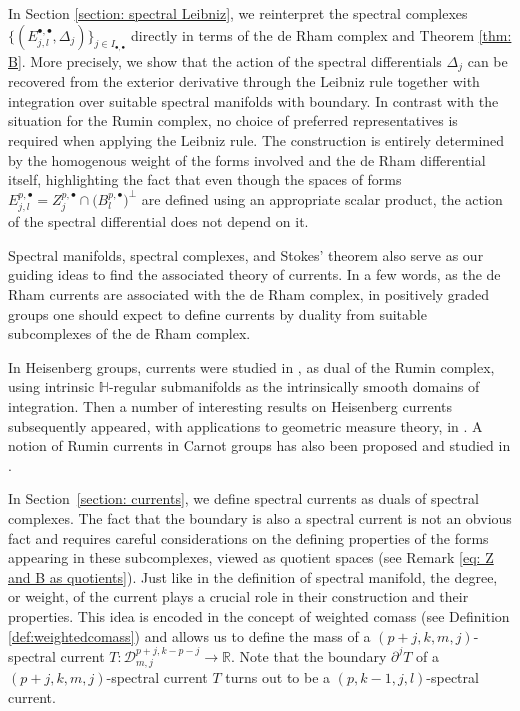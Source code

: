\documentclass[dvipsnames]{amsart}
\theoremstyle{definition}
\theoremstyle{definition}
\numberwithin{equation}{section}
\newcommand{\R}{\mathbb{R}}
\renewcommand{\H}{\mathbb{H}}
\begin{document}
In Section \ref{section: spectral Leibniz}, we reinterpret the spectral complexes $\{(E_{j,l}^{\bullet,\bullet},\Delta_j)\}_{j\in I_{\bullet,\bullet}}$ directly in terms of the de Rham complex and Theorem \ref{thm: B}. More precisely, we show that the action of the spectral differentials $\Delta_j$ can be recovered from the exterior derivative through the Leibniz rule together with integration over suitable spectral manifolds with boundary. In contrast with the situation for the Rumin complex, no choice of preferred representatives is required when applying the Leibniz rule. The construction is entirely determined by the homogenous weight of the forms involved and the de Rham differential itself, highlighting the fact that even though the spaces of forms $E_{j,l}^{p,\bullet}=Z_j^{p,\bullet}\cap\big(B_l^{p,\bullet}\big)^\perp$ are defined using an appropriate scalar product, the action of the spectral differential does not depend on it. 


Spectral manifolds, spectral complexes, and Stokes' theorem also serve as our guiding ideas to find the associated theory of currents. In a few words, as the de Rham currents are associated with the de Rham complex, in positively graded groups one should expect to define currents by duality from suitable subcomplexes of the de Rham complex.

In Heisenberg groups, currents were studied in \cite{FSSC6}, as dual of the Rumin complex, using intrinsic $\H$-regular submanifolds as the intrinsically smooth domains of integration. Then a number of interesting results on Heisenberg currents subsequently appeared, with applications to geometric measure theory, in \cite{StokesFranchi,FSSC6,Can21jga,Vit22,JulNGolVit2023,DiMJulNGoloVit25,franchi2025currents}. A notion of Rumin currents in Carnot groups has also been proposed and studied in \cite{julia2023flat}. 

In Section~\ref{section: currents}, we define spectral currents as duals of spectral complexes. 
The fact that the boundary is also a spectral current is not an obvious fact and requires careful considerations on the defining properties of the forms appearing in these subcomplexes, viewed as quotient spaces (see Remark \ref{eq: Z and B as quotients}). Just like in the definition of spectral manifold, the degree, or weight, of the current plays a crucial role in their construction and their properties. This idea is encoded in the concept of weighted comass (see Definition \ref{def:weightedcomass}) and allows us to define the mass of a $(p+j,k,m,j)$-spectral current $T\colon \mathscr D_{m,j}^{p+j,k-p-j}\longrightarrow\R$. Note that the boundary $\partial^jT$ of a $(p+j,k,m,j)$-spectral current $T$ turns out to be a $(p,k-1,j,l)$-spectral current.
\end{document}
